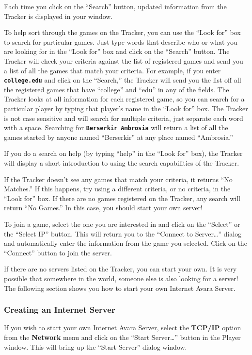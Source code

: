 \documentclass{article}
\begin{document}
Each time you click on the ``Search'' button, updated information from the Tracker is displayed in your window.

To help sort through the games on the Tracker, you can use the ``Look for'' box to search for particular games. Just type words that describe who or what you are looking for in the ``Look for'' box and click on the ``Search'' button. The Tracker will check your criteria against the list of registered games and send you a list of all the games that match your criteria. For example, if you enter \textbf{\texttt{college.edu}} and click on the ``Search,'' the Tracker will send you the list off all the registered games that have ``college'' and ``edu'' in any of the fields. The Tracker looks at all information for each registered game, so you can search for a particular player by typing that player's name in the ``Look for'' box. The Tracker is not case sensitive and will search for multiple criteria, just separate each word with a space. Searching for \textbf{\texttt{Berserkir Ambrosia}} will return a list of all the games started by anyone named ``Berserkir'' at any place named ``Ambrosia.''

If you do a search on help (by typing ``help'' in the ``Look for'' box), the Tracker will display a short introduction to using the search capabilities of the Tracker.

If the Tracker doesn't see any games that match your criteria, it returns ``No Matches.'' If this happens, try using a different criteria, or no criteria, in the ``Look for'' box. If there are no games registered on the Tracker, any search will return ``No Games.'' In this case, you should start your own server!

To join a game, select the one you are interested in and click on the ``Select'' or the ``Select IP'' button. This will return you to the ``Connect to Server\dots'' dialog and automatically enter the information from the game you selected. Click on the ``Connect'' button to join the server.

If there are no servers listed on the Tracker, you can start your own. It is very possible that somewhere in the world, someone else is also looking for a server! The following section shows you how to start your own Internet Avara Server.

\subsubsection{Creating an Internet Server}
If you wish to start your own Internet Avara Server, select the \textbf{TCP/IP} option from the \textbf{Network} menu and click on the ``Start Server\dots'' button in the Player window. This will bring up the ``Start Server'' dialog window.
\end{document}

